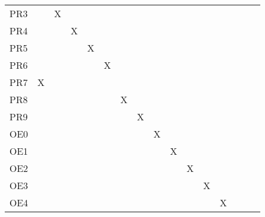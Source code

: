 \documentclass[12pt, titlepage]{article}
\begin{document}
\begin{longtable}{llllllllllllllll}
\multicolumn{1}{l|}{PR3} & \multicolumn{1}{c}{} & \multicolumn{1}{c}{X} & \multicolumn{1}{c}{} & \multicolumn{1}{c}{} & \multicolumn{1}{c}{} &  &  &  &  &  &  &  &  &  &  \\
\multicolumn{1}{l|}{PR4} & \multicolumn{1}{c}{} & \multicolumn{1}{c}{} & \multicolumn{1}{c}{X} & \multicolumn{1}{c}{} & \multicolumn{1}{c}{} &  &  &  &  &  &  &  &  &  &  \\
\multicolumn{1}{l|}{PR5} & \multicolumn{1}{c}{} & \multicolumn{1}{c}{} & \multicolumn{1}{c}{} & \multicolumn{1}{c}{X} & \multicolumn{1}{c}{} &  &  &  &  &  &  &  &  &  &  \\
\multicolumn{1}{l|}{PR6} & \multicolumn{1}{c}{} & \multicolumn{1}{c}{} & \multicolumn{1}{c}{} & \multicolumn{1}{c}{} & \multicolumn{1}{c}{X} &  &  &  &  &  &  &  &  &  &  \\
\multicolumn{1}{l|}{PR7} & \multicolumn{1}{c}{X} & \multicolumn{1}{c}{} & \multicolumn{1}{c}{} & \multicolumn{1}{c}{} & \multicolumn{1}{c}{} &  &  &  &  &  &  &  &  &  &  \\
\multicolumn{1}{l|}{PR8} & \multicolumn{1}{c}{} & \multicolumn{1}{c}{} & \multicolumn{1}{c}{} & \multicolumn{1}{c}{} & \multicolumn{1}{c}{} & \multicolumn{1}{c}{X} &  &  &  &  &  &  &  &  &  \\
\multicolumn{1}{l|}{PR9} & \multicolumn{1}{c}{} & \multicolumn{1}{c}{} & \multicolumn{1}{c}{} & \multicolumn{1}{c}{} & \multicolumn{1}{c}{} &  & \multicolumn{1}{c}{X} &  &  &  &  &  &  &  &  \\
\multicolumn{1}{l|}{OE0} & \multicolumn{1}{c}{} & \multicolumn{1}{c}{} & \multicolumn{1}{c}{} & \multicolumn{1}{c}{} & \multicolumn{1}{c}{} &  &  & \multicolumn{1}{c}{X} &  &  &  &  &  &  &  \\
\multicolumn{1}{l|}{OE1} &  &  &  &  &  &  &  &  & \multicolumn{1}{c}{X} & \multicolumn{1}{c}{} & \multicolumn{1}{c}{} & \multicolumn{1}{c}{} & \multicolumn{1}{c}{} & \multicolumn{1}{c}{} & \multicolumn{1}{c}{} \\
\multicolumn{1}{l|}{OE2} &  &  &  &  &  &  &  &  & \multicolumn{1}{c}{} & \multicolumn{1}{c}{X} & \multicolumn{1}{c}{} & \multicolumn{1}{c}{} & \multicolumn{1}{c}{} & \multicolumn{1}{c}{} & \multicolumn{1}{c}{} \\
\multicolumn{1}{l|}{OE3} &  &  &  &  &  &  &  &  & \multicolumn{1}{c}{} & \multicolumn{1}{c}{} & \multicolumn{1}{c}{X} & \multicolumn{1}{c}{} & \multicolumn{1}{c}{} & \multicolumn{1}{c}{} & \multicolumn{1}{c}{} \\
\multicolumn{1}{l|}{OE4} &  &  &  &  &  &  &  &  & \multicolumn{1}{c}{} & \multicolumn{1}{c}{} & \multicolumn{1}{c}{} & \multicolumn{1}{c}{X} & \multicolumn{1}{c}{} & \multicolumn{1}{c}{} & \multicolumn{1}{c}{} \\

\end{longtable}
\end{document}
